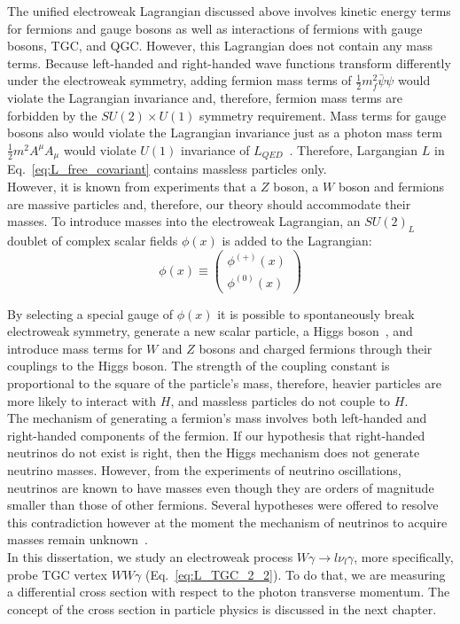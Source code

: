 The unified electroweak Lagrangian discussed above involves kinetic energy terms for fermions and gauge bosons as well as interactions of fermions with gauge bosons, TGC, and QGC. However, this Lagrangian does not contain any mass terms. Because left-handed and right-handed wave functions transform differently under the electroweak symmetry, adding fermion mass terms of $\frac{1}{2} m_f^2 \bar{\psi} \psi$ would violate the Lagrangian invariance and, therefore, fermion mass terms are forbidden by the $SU(2) \times U(1)$ symmetry requirement. Mass terms for gauge bosons also would violate the Lagrangian invariance just as a photon mass term $\frac{1}{2} m^2 A^\mu A_\mu$ would violate $U(1)$ invariance of $L_{QED}$~\cite{ref_Griffiths}. Therefore, Largangian $L$ in Eq.~\ref{eq:L_free_covariant} contains massless particles only.\\

However, it is known from experiments that a $Z$ boson, a $W$ boson and fermions are massive particles and, therefore, our theory should accommodate their masses. To introduce masses into the electroweak Lagrangian, an $SU(2)_L$ doublet of complex scalar fields $\phi(x)$ is added to the Lagrangian:\\

\begin{equation}\label{eq:H_doublet}
  \phi(x) \equiv \begin{pmatrix} \phi^{(+)}(x) \\ \phi^{(0)}(x) \end{pmatrix}
\end{equation}

By selecting a special gauge of $\phi(x)$ it is possible to spontaneously break electroweak symmetry, generate a new scalar particle, a Higgs boson~\cite{ref_Pich}, and introduce mass terms for $W$ and $Z$ bosons and charged fermions through their couplings to the Higgs boson. The strength of the coupling constant is proportional to the square of the particle's mass, therefore, heavier particles are more likely to interact with $H$, and massless particles do not couple to $H$.\\

The mechanism of generating a fermion's mass involves both left-handed and right-handed components of the fermion. If our hypothesis that right-handed neutrinos do not exist is right, then the Higgs mechanism does not generate neutrino masses. However, from the experiments of neutrino oscillations, neutrinos are known to have masses even though they are orders of magnitude smaller than those of other fermions. Several hypotheses were offered to resolve this contradiction however at the moment the mechanism of neutrinos to acquire masses remain unknown~\cite{ref_PDG}.\\

In this dissertation, we study an electroweak process $W\gamma \rightarrow l \nu_l \gamma$, more specifically, probe TGC vertex $WW\gamma$ (Eq.~\ref{eq:L_TGC_2_2}). To do that, we are measuring a differential cross section with respect to the photon transverse momentum. The concept of the cross section in particle physics is discussed in the next chapter.\\

